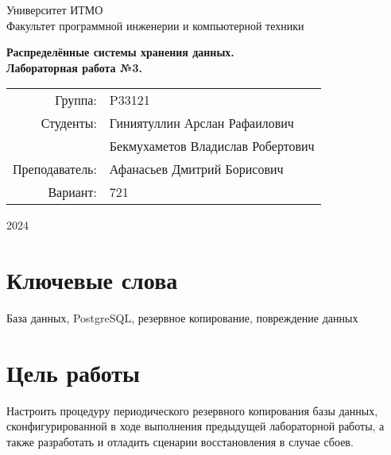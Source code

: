 \documentclass{article}
\begin{document}
\begin{titlepage}
    \begin{center}
        \begin{spacing}{1.4}
            \large{Университет ИТМО} \\
            \large{Факультет программной инженерии и компьютерной техники} \\
        \end{spacing}
        \vfill
        \textbf{
            \huge{Распределённые системы хранения данных.} \\
            \huge{Лабораторная работа №3.} \\
        }
    \end{center}
    \vfill
    \begin{center}
        \begin{tabular}{r l}
            Группа:        & P33121                      \\
            Студенты:       & Гиниятуллин Арслан Рафаилович \\
                            & Бекмухаметов Владислав Робертович   \\
            Преподаватель: & Афанасьев Дмитрий Борисович \\
            Вариант:       & 721 \\
        \end{tabular}
    \end{center}
    \vfill
    \begin{center}
        \begin{large}
            2024
        \end{large}
    \end{center}
\end{titlepage}

\section*{Ключевые слова}

База данных, PostgreSQL, резервное копирование, повреждение данных

\tableofcontents

\section{Цель работы}

Настроить процедуру периодического резервного копирования базы данных, сконфигурированной в ходе выполнения предыдущей лабораторной работы, а также разработать и отладить сценарии восстановления в случае сбоев.
\end{document}
